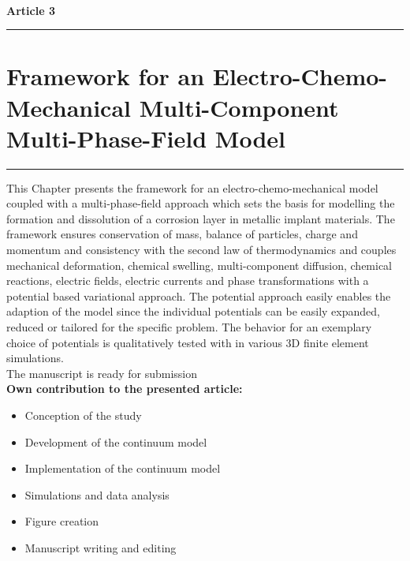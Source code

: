\ \vspace{1cm} \\
{\Large \bf Article 3}
\normalsize
\vspace{0.3cm}
\hrule
\section*{\Large \centering Framework for an Electro-Chemo-Mechanical Multi-Component Multi-Phase-Field Model}
\hrule
\vspace{1.5cm}

This Chapter presents the framework for an electro-chemo-mechanical model coupled with a multi-phase-field approach which sets the basis for modelling the formation and dissolution of a corrosion layer in metallic implant materials. The framework ensures conservation of mass, balance of particles, charge and momentum and consistency with the second law of thermodynamics and couples mechanical deformation, chemical swelling, multi-component diffusion, chemical reactions, electric fields, electric currents and phase transformations with a potential based variational approach. The potential approach easily enables the adaption of the model since the individual potentials can be easily expanded, reduced or tailored for the specific problem. The behavior for an exemplary choice of potentials is qualitatively tested with in various 3D finite element simulations.  \\

The manuscript is ready for submission \\

\textbf{Own contribution to the presented article:}
\begin{itemize}
\item Conception of the study
\item Development of the continuum model
\item Implementation of the continuum model
\item Simulations and data analysis
\item Figure creation 
\item Manuscript writing and editing
\end{itemize}

\newpage

